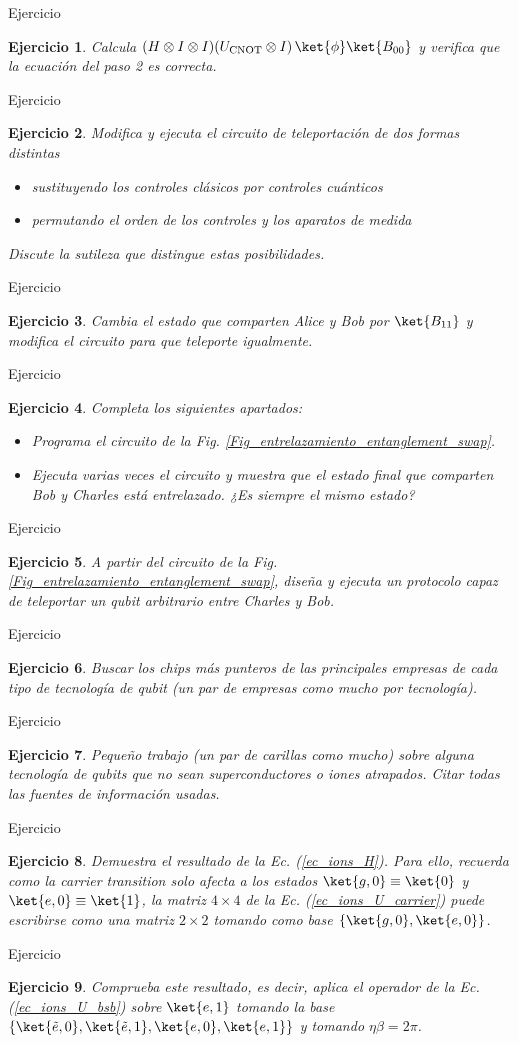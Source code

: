 \documentclass[a4paper,11pt]{book} %
\newtheorem{ejercicio_contador}{Ejercicio}
\newcommand{\Ejercicio}[1]{
		\begin{mybox_gray}{Ejercicio} 
			\begin{ejercicio_contador}
				 #1 
			\end{ejercicio_contador} 
		\end{mybox_gray}
	}
\numberwithin{equation}{chapter}
\def\lch{\left\{}
\def\rch{\right\}}
\begin{document}
\Ejercicio{
Calcula $(H \otimes I\otimes I)(U_{\rm CNOT}\otimes I)\, \ket{\phi}\ket{B_{00}}$ y verifica que la ecuación del paso 2 es correcta.
}

\Ejercicio{
Modifica y ejecuta  el circuito de teleportación de dos formas distintas
\begin{itemize}
\item[a)] sustituyendo los controles clásicos por controles cuánticos
\item[b)] permutando el orden de los controles y los aparatos de medida
\end{itemize}
Discute la sutileza que distingue estas posibilidades.
}

\Ejercicio{
Cambia el estado que comparten Alice y Bob por $\ket{B_{11}}$ y modifica el circuito para que teleporte igualmente.
}

\Ejercicio{
Completa los siguientes apartados:
\begin{itemize}
\item[a)] Programa el circuito de la Fig. \ref{Fig_entrelazamiento_entanglement_swap}.
\item[b)] Ejecuta varias veces el circuito y muestra que el estado final que comparten Bob y Charles está entrelazado. ¿Es siempre el mismo estado?
\end{itemize}
}

\Ejercicio{
A partir del circuito de la Fig. \ref{Fig_entrelazamiento_entanglement_swap}, diseña y ejecuta un protocolo capaz de teleportar un qubit arbitrario entre Charles y Bob.
}

\Ejercicio{
Buscar los chips más punteros de las principales empresas de cada tipo de tecnología de qubit (un par de empresas como mucho por tecnología).
}

\Ejercicio{
Pequeño trabajo (un par de carillas como mucho) sobre alguna tecnología de qubits que no sean superconductores o iones atrapados. Citar todas las fuentes de información usadas.
}

\Ejercicio{
Demuestra el resultado de la Ec. (\ref{ec_ions_H}). Para ello, recuerda como la \textit{carrier transition} solo afecta a los estados  $\ket{g,0} \equiv \ket{0}$ y $\ket{e,0} \equiv \ket{1}$, la matriz $4\times4$ de la Ec. (\ref{ec_ions_U_carrier}) puede escribirse como una matriz $2\times2$ tomando como base $\{\ket{g,0},\ket{e,0}\}$.
}

\Ejercicio{
Comprueba este resultado, es decir, aplica el operador de la Ec. (\ref{ec_ions_U_bsb}) sobre $\ket{e,1}$ tomando la base $\lch \ket{\tilde{e},0}, \ket{\tilde{e},1}, \ket{e,0}, \ket{e,1} \rch$ y tomando $\eta \beta = 2\pi$.
}
\end{document}
